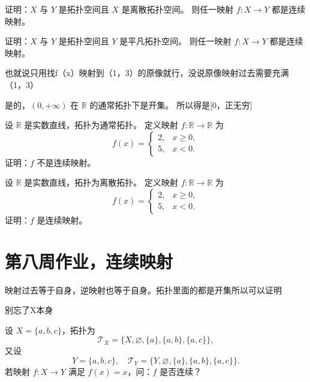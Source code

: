 \begin{homework}[1]
证明：\(X\) 与 \(Y\) 是拓扑空间且 \(X\) 是离散拓扑空间。  
则任一映射 \(f:X\to Y\) 都是连续映射。
\end{homework}

\begin{homework}[2]
证明：\(X\) 与 \(Y\) 是拓扑空间且 \(Y\) 是平凡拓扑空间。  
则任一映射 \(f:X\to Y\) 都是连续映射。
\end{homework}
\begin{dxtips}
    也就说只用找f（x）映射到（1，3）的原像就行，没说原像映射过去需要充满（1，3）
\end{dxtips}
\begin{dxtips}
    是的，$(0,+\infty)$ 在 $\mathbb{R}$ 的通常拓扑下是开集。
    所以得是[0，正无穷]
\end{dxtips}
\begin{homework}[5]
设 \(\mathbb{R}\) 是实数直线，拓扑为通常拓扑。  
定义映射 \(f:\mathbb{R}\to\mathbb{R}\) 为
\[
f(x)=
\begin{cases}
2, & x\ge0,\\
5, & x<0.
\end{cases}
\]
证明：\(f\) 不是连续映射。
\end{homework}

\begin{homework}[6]
设 \(\mathbb{R}\) 是实数直线，拓扑为离散拓扑。  
定义映射 \(f:\mathbb{R}\to\mathbb{R}\) 为
\[
f(x)=
\begin{cases}
2, & x\ge0,\\
5, & x<0.
\end{cases}
\]
证明：\(f\) 是连续映射。
\end{homework}

\section{第八周作业，连续映射}
\begin{dxtips}
    映射过去等于自身，逆映射也等于自身。拓扑里面的都是开集所以可以证明
\end{dxtips}
\begin{dxtips}
    别忘了X本身
\end{dxtips}
\begin{homework}[7]
设 $X=\{a,b,c\}$，拓扑为 
\[
\mathcal{T}_X=\{X,\varnothing,\{a\},\{a,b\},\{a,c\}\},
\]
又设
\[
Y=\{a,b,c\},\quad 
\mathcal{T}_Y=\{Y,\varnothing,\{a\},\{a,b\},\{a,c\}\}.
\]
若映射 $f:X\to Y$ 满足 $f(x)=x$，问：$f$ 是否连续？
\end{homework}

